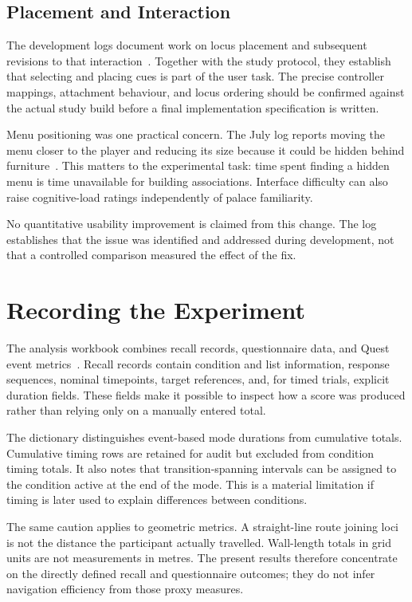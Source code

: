 \subsection{Placement and Interaction}
The development logs document work on locus placement and subsequent revisions to that interaction~\cite{logmarch13,logmay15}. Together with the study protocol, they establish that selecting and placing cues is part of the user task. The precise controller mappings, attachment behaviour, and locus ordering should be confirmed against the actual study build before a final implementation specification is written.

Menu positioning was one practical concern. The July log reports moving the menu closer to the player and reducing its size because it could be hidden behind furniture~\cite{logjuly17}. This matters to the experimental task: time spent finding a hidden menu is time unavailable for building associations. Interface difficulty can also raise cognitive-load ratings independently of palace familiarity.

No quantitative usability improvement is claimed from this change. The log establishes that the issue was identified and addressed during development, not that a controlled comparison measured the effect of the fix.

\section{Recording the Experiment}
The analysis workbook combines recall records, questionnaire data, and Quest event metrics~\cite{srooranalysis}. Recall records contain condition and list information, response sequences, nominal timepoints, target references, and, for timed trials, explicit duration fields. These fields make it possible to inspect how a score was produced rather than relying only on a manually entered total.

The dictionary distinguishes event-based mode durations from cumulative totals. Cumulative timing rows are retained for audit but excluded from condition timing totals. It also notes that transition-spanning intervals can be assigned to the condition active at the end of the mode. This is a material limitation if timing is later used to explain differences between conditions.

The same caution applies to geometric metrics. A straight-line route joining loci is not the distance the participant actually travelled. Wall-length totals in grid units are not measurements in metres. The present results therefore concentrate on the directly defined recall and questionnaire outcomes; they do not infer navigation efficiency from those proxy measures.

